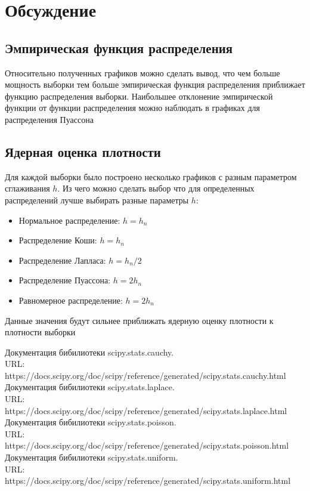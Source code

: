 \documentclass{article}
\begin{document}
\newpage
\section{Обсуждение}

\subsection{Эмпирическая функция распределения}
Относительно полученных графиков можно сделать вывод, что чем больше мощность выборки тем больше эмпирическая функция распределения приближает функцию распределения выборки. Наибольшее отклонение эмпирической функции от функции распределения можно наблюдать в графиках для распределения Пуассона

\subsection{Ядерная оценка плотности}
Для каждой выборки было построено несколько графиков с разным параметром сглаживания $h$. Из чего можно сделать выбор что для определенных распределений лучше выбирать разные параметры $h$:
\begin{itemize}
	\item Нормальное распределение: $h=h_n$
	\item Распределение Коши: $h=h_n$
	\item Распределение Лапласа: $h=h_n/2$
	\item Распределение Пуассона: $h=2h_n$
	\item Равномерное распределение: $h=2h_n$
\end{itemize}
Данные значения будут сильнее приближать ядерную оценку плотности к плотности выборки

\newpage
\begin{thebibliography}{4}
Документация бибилиотеки scipy.stats.cauchy. 
\\ URL: https://docs.scipy.org/doc/scipy/reference/generated/scipy.stats.cauchy.html
Документация бибилиотеки scipy.stats.laplace. 
\\ URL: https://docs.scipy.org/doc/scipy/reference/generated/scipy.stats.laplace.html
Документация бибилиотеки scipy.stats.poisson.
\\ URL: https://docs.scipy.org/doc/scipy/reference/generated/scipy.stats.poisson.html
Документация бибилиотеки scipy.stats.uniform.
\\ URL: https://docs.scipy.org/doc/scipy/reference/generated/scipy.stats.uniform.html
\end{thebibliography}
\end{document}
